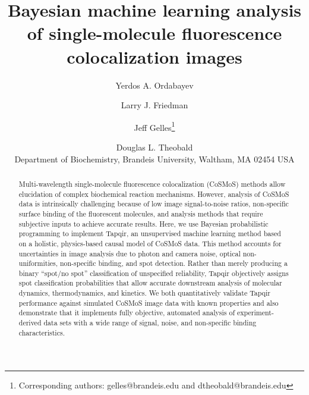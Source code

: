 \documentclass{article}
\title{Bayesian machine learning analysis of single-molecule fluorescence colocalization images}
\author{Yerdos A. Ordabayev\and Larry  J. Friedman\and Jeff Gelles\thanks{Corresponding authors: gelles@brandeis.edu and dtheobald@brandeis.edu}\and Douglas L. Theobald\footnotemark[1] \\ Department of Biochemistry, Brandeis University, Waltham, MA 02454 USA}
\begin{document}
\maketitle
\begin{abstract} %
Multi-wavelength single-molecule fluorescence colocalization (CoSMoS) methods allow elucidation of complex biochemical reaction mechanisms. However, analysis of CoSMoS data is intrinsically challenging because of low image signal-to-noise ratios, non-specific surface binding of the fluorescent molecules, and analysis methods that require subjective inputs to achieve accurate results. Here, we use Bayesian probabilistic programming to implement Tapqir, an unsupervised machine learning method based on a holistic, physics-based causal model of CoSMoS data.  This method accounts for uncertainties in image analysis due to photon and camera noise, optical non-uniformities, non-specific binding, and spot detection. Rather than merely producing a binary ``spot/no spot'' classification of unspecified reliability, Tapqir objectively assigns spot classification probabilities that allow accurate downstream analysis of molecular dynamics, thermodynamics, and kinetics.   We both quantitatively validate Tapqir performance against simulated CoSMoS image data with known properties and also demonstrate that it implements fully objective, automated analysis of experiment-derived data sets with a wide range of signal, noise, and non-specific binding characteristics. 
\end{abstract}











\printbibliography






\end{document}
